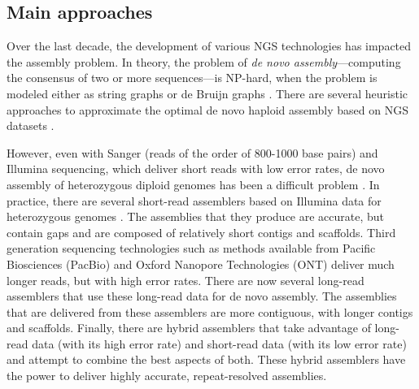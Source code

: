\subsection{Main approaches}
Over the last decade, the development of various NGS technologies has impacted the assembly problem.
In theory, the problem of \textit{de novo assembly}---computing the consensus of two or more sequences---is NP-hard, when the problem is modeled either as string graphs or de Bruijn graphs \citep{medvedev2007computability}. 
There are several heuristic approaches to approximate the optimal de novo haploid assembly based on NGS datasets \citep{idury1995new, myers1995toward, myers2005fragment, pevzner2001eulerian, nagarajan2009parametric, nagarajan2013sequence, sovic2013approaches}.

However, even with Sanger (reads of the order of 800-1000 base pairs) and Illumina sequencing, which deliver short reads with low error rates, de novo assembly of heterozygous diploid genomes has been a difficult problem \citep{vinson2005assembly, levy2007diploid}.
In practice, there are several short-read assemblers based on Illumina data for heterozygous genomes \citep{kajitani2014efficient, pryszcz2016redundans, simpson2012efficient, bankevich2012spades, li2015fermikit}.
The assemblies that they produce are accurate, but contain gaps and are composed of relatively short contigs and scaffolds. 
Third generation sequencing technologies such as methods available from Pacific Biosciences (PacBio) and Oxford Nanopore Technologies (ONT) deliver much longer reads, but with high error rates.
There are now several long-read assemblers \citep{koren2017canu, vaser2017fast, xiao2016mecat, berlin2015assembling, chin2013nonhybrid, hunt2015circlator, lin2016assembly} that use these long-read data for de novo assembly.
The assemblies that are delivered from these assemblers are more contiguous, with longer contigs and scaffolds.
Finally, there are hybrid assemblers that take advantage of long-read data (with its high error rate) and short-read data (with its low error rate) \citep{bashir2012hybrid, antipov2015hybridspades, zimin2017hybrid} and attempt to combine the best aspects of both.
These hybrid assemblers have the power to deliver highly accurate, repeat-resolved assemblies.

